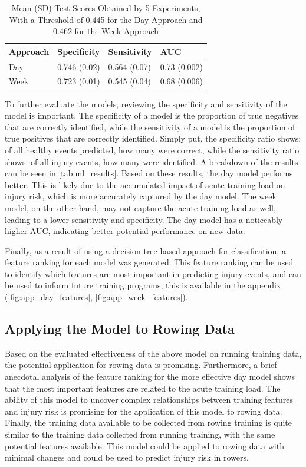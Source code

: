 \begin{table}[hb]
  \centering
  \captionsetup{labelfont=bf,textfont=bf}
  \caption[Runner Injury Prevention Approach Comparison]{Mean (SD) Test Scores Obtained by 5 Experiments, With a Threshold of 0.445 for the Day Approach and 0.462 for the Week Approach}
  \label{tab:ml_results}
  \begin{tabularx}{\textwidth}{@{}l *{3}{Y}@{}}
    \toprule
    \textbf{Approach} & \textbf{Specificity} & \textbf{Sensitivity} & \textbf{AUC} \\ \midrule
    Day & 0.746 (0.02) & 0.564 (0.07) & 0.73 (0.002) \\
    Week & 0.723 (0.01) & 0.545 (0.04) & 0.68 (0.006) \\ \bottomrule
  \end{tabularx}%
\end{table}

To further evaluate the models, reviewing the specificity and sensitivity of the model is important. The specificity of a model is the proportion of true negatives that are correctly identified, while the sensitivity of a model is the proportion of true positives that are correctly identified. Simply put, the specificity ratio shows: of all healthy events predicted, how many were correct, while the sensitivity ratio shows: of all injury events, how many were identified. A breakdown of the results can be seen in \autoref{tab:ml_results}. Based on these results, the day model performs better. This is likely due to the accumulated impact of acute training load on injury risk, which is more accurately captured by the day model. The week model, on the other hand, may not capture the acute training load as well, leading to a lower sensitivity and specificity. The day model has a noticeably higher AUC, indicating better potential performance on new data.

Finally, as a result of using a decision tree-based approach for classification, a feature ranking for each model was generated. This feature ranking can be used to identify which features are most important in predicting injury events, and can be used to inform future training programs, this is available in the appendix (\autoref{fig:app_day_features}, \autoref{fig:app_week_features}).


\subsection{Applying the Model to Rowing Data}
Based on the evaluated effectiveness of the above model on running training data, the potential application for rowing data is promising. Furthermore, a brief anecdotal analysis of the feature ranking for the more effective day model shows that the most important features are related to the acute training load. The ability of this model to uncover complex relationships between training features and injury risk is promising for the application of this model to rowing data. Finally, the training data available to be collected from rowing training is quite similar to the training data collected from running training, with the same potential features available. This model could be applied to rowing data with minimal changes and could be used to predict injury risk in rowers.